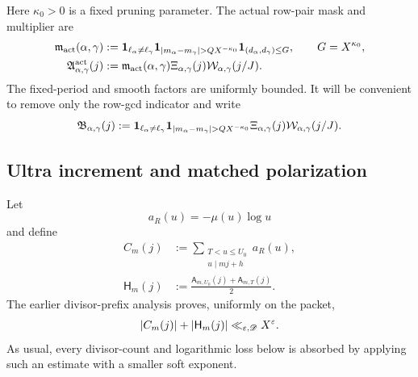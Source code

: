 Here \(\kappa_0>0\) is a fixed pruning parameter.  The actual row-pair
mask and multiplier are
\begin{align}
 \mathfrak m_{\rm act}(\alpha,\gamma)
 &:=
 \one_{\ell_\alpha\ne\ell_\gamma}
 \one_{|m_\alpha-m_\gamma|>QX^{-\kappa_0}}
 \one_{(d_\alpha,d_\gamma)\le G},
 \qquad G=X^{\kappa_0},
 \label{eq:tpc34-actual-mask}\\
 \mathfrak A_{\alpha,\gamma}^{\rm act}(j)
 &:=
 \mathfrak m_{\rm act}(\alpha,\gamma)
 \Xi_{\alpha,\gamma}(j)
 \cW_{\alpha,\gamma}(j/J).
 \label{eq:tpc34-actual-multiplier}
\end{align}
The fixed-period and smooth factors are uniformly bounded.  It will be
convenient to remove only the row-gcd indicator and write
\begin{equation}
 \mathfrak B_{\alpha,\gamma}(j)
 :=
 \one_{\ell_\alpha\ne\ell_\gamma}
 \one_{|m_\alpha-m_\gamma|>QX^{-\kappa_0}}
 \Xi_{\alpha,\gamma}(j)\cW_{\alpha,\gamma}(j/J).
 \label{eq:tpc34-mask-without-gcd}
\end{equation}

\subsection{Ultra increment and matched polarization}

Let
\begin{equation}
 a_R(u)=-\mu(u)\log u
 \label{eq:tpc34-ultra-coefficient}
\end{equation}
and define
\begin{align}
 C_m(j)
 &:=\sum_{\substack{T<u\le U_0\\u\mid mj+h}}a_R(u),
 \label{eq:tpc34-ultra-increment}\\
 \mathsf H_m(j)
 &:=\frac{\mathsf A_{m,U_0}(j)+\mathsf A_{m,T}(j)}2.
 \label{eq:tpc34-half-prefix}
\end{align}
The earlier divisor-prefix analysis proves, uniformly on the packet,
\begin{equation}
 |C_m(j)|+|\mathsf H_m(j)|
 \ll_{\varepsilon,\mathscr D}X^\varepsilon.
 \label{eq:tpc34-prefix-envelope}
\end{equation}
As usual, every divisor-count and logarithmic loss below is absorbed by
applying such an estimate with a smaller soft exponent.

